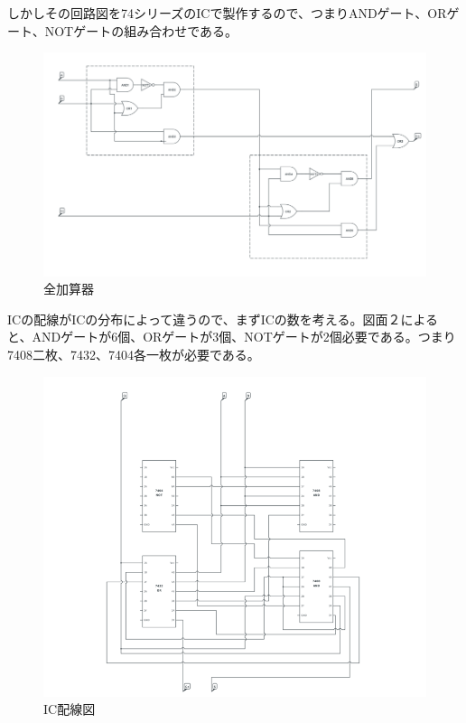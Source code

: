\documentclass[xelatex,ja=standard,jafont=noto]{bxjsarticle}
\begin{document}
しかしその回路図を74シリーズのICで製作するので、つまりANDゲート、ORゲート、NOTゲートの組み合わせである。


\begin{figure}[h!]
    \centering
    \includegraphics[scale=0.4]{fuller.png}
    \caption{全加算器}
\end{figure}



\newpage






ICの配線がICの分布によって違うので、まずICの数を考える。図面２によると、ANDゲートが6個、ORゲートが3個、NOTゲートが2個必要である。つまり7408二枚、7432、7404各一枚が必要である。\\


\begin{figure}[h!]
    \centering
    \includegraphics[scale=0.75]{IC.png}
    \caption{IC配線図}
\end{figure}
\end{document}
